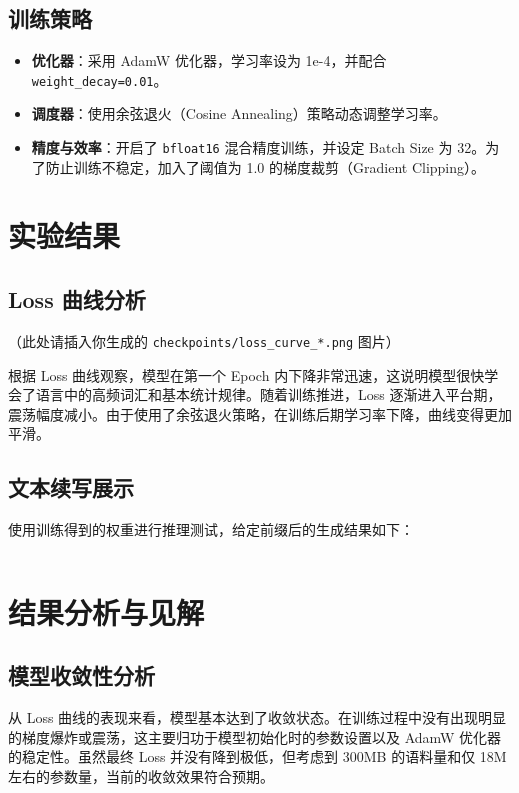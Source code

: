 \documentclass[a4paper,12pt]{ctexart} %
\begin{document}
\subsection{训练策略}
\begin{itemize}
    \item \textbf{优化器}：采用 AdamW 优化器，学习率设为 1e-4，并配合 \texttt{weight\_decay=0.01}。
    \item \textbf{调度器}：使用余弦退火（Cosine Annealing）策略动态调整学习率。
    \item \textbf{精度与效率}：开启了 \texttt{bfloat16} 混合精度训练，并设定 Batch Size 为 32。为了防止训练不稳定，加入了阈值为 1.0 的梯度裁剪（Gradient Clipping）。
\end{itemize}

\section{实验结果}

\subsection{Loss 曲线分析}
（此处请插入你生成的 \texttt{checkpoints/loss\_curve\_*.png} 图片）

根据 Loss 曲线观察，模型在第一个 Epoch 内下降非常迅速，这说明模型很快学会了语言中的高频词汇和基本统计规律。随着训练推进，Loss 逐渐进入平台期，震荡幅度减小。由于使用了余弦退火策略，在训练后期学习率下降，曲线变得更加平滑。

\subsection{文本续写展示}
使用训练得到的权重进行推理测试，给定前缀后的生成结果如下：

\begin{lstlisting}[caption={推理生成示例}]
\end{lstlisting}

\section{结果分析与见解}

\subsection{模型收敛性分析}
从 Loss 曲线的表现来看，模型基本达到了收敛状态。在训练过程中没有出现明显的梯度爆炸或震荡，这主要归功于模型初始化时的参数设置以及 AdamW 优化器的稳定性。虽然最终 Loss 并没有降到极低，但考虑到 300MB 的语料量和仅 18M 左右的参数量，当前的收敛效果符合预期。
\end{document}
